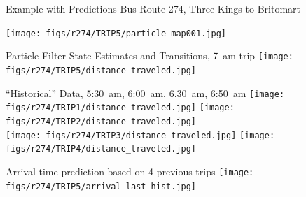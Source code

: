 \documentclass[10pt,t]{beamer}
\begin{document}
\begin{frame}{Example with Predictions}
  Bus Route 274, Three Kings to Britomart


  \begin{overprint}
    \centering
    \texttt{[image: figs/r274/TRIP5/particle\_map001.jpg]}

    \vspace{2em}
    Particle Filter State Estimates and Transitions, 7~am trip
    \centering
    \texttt{[image: figs/r274/TRIP5/distance\_traveled.jpg]}

    \vspace{2em}
    ``Historical'' Data, 5:30~am, 6:00~am, 6.30~am, 6:50~am
    \centering
    \texttt{[image: figs/r274/TRIP1/distance\_traveled.jpg]}
    \texttt{[image: figs/r274/TRIP2/distance\_traveled.jpg]}\\
    \texttt{[image: figs/r274/TRIP3/distance\_traveled.jpg]}
    \texttt{[image: figs/r274/TRIP4/distance\_traveled.jpg]}

    \vspace{2em}
    Arrival time prediction based on 4 previous trips
    \centering
    \texttt{[image: figs/r274/TRIP5/arrival\_last\_hist.jpg]}
  \end{overprint}
\end{frame}
\end{document}
